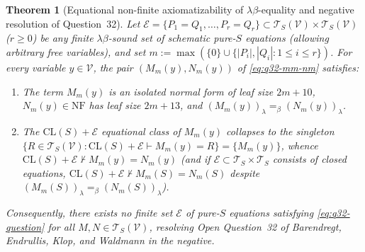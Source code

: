 \documentclass[11pt,reqno]{amsart}
\numberwithin{equation}{section}
\theoremstyle{plain}
\newtheorem{theorem}{Theorem}[section]
\theoremstyle{definition}
\theoremstyle{remark}
\newcommand{\CLS}{\mathrm{CL}(S)}
\newcommand{\TS}{\mathcal{T}_S}
\newcommand{\TSV}{\mathcal{T}_S(\mathcal{V})}
\newcommand{\NF}{\mathrm{NF}}
\begin{document}
\begin{theorem}[Equational non-finite axiomatizability of $\lambda\beta$-equality and negative resolution of Question~32]\label{thm:question-32}
Let $\mathcal{E} = \{P_1 = Q_1, \dots, P_r = Q_r\} \subset \TSV \times \TSV$ ($r \ge 0$) be any finite $\lambda\beta$-sound set of schematic pure-$S$ equations (allowing arbitrary free variables), and set $m := \max(\{0\} \cup \{|P_i|, |Q_i| : 1 \le i \le r\})$. For every variable $y \in \mathcal{V}$, the pair $(M_m(y), N_m(y))$ of \eqref{eq:q32-mm-nm} satisfies:
\begin{enumerate}[label=(\roman*),leftmargin=2.2em]
  \item The term $M_m(y)$ is an isolated normal form of leaf size $2m + 10$, $N_m(y) \in \NF$ has leaf size $2m + 13$, and $(M_m(y))_\lambda =_\beta (N_m(y))_\lambda$.
  \item The $\CLS + \mathcal{E}$ equational class of $M_m(y)$ collapses to the singleton $\{R \in \TSV : \CLS + \mathcal{E} \vdash M_m(y) = R\} = \{M_m(y)\}$, whence $\CLS + \mathcal{E} \nvdash M_m(y) = N_m(y)$ (and if $\mathcal{E} \subset \TS \times \TS$ consists of closed equations, $\CLS + \mathcal{E} \nvdash M_m(S) = N_m(S)$ despite $(M_m(S))_\lambda =_\beta (N_m(S))_\lambda$).
\end{enumerate}
Consequently, there exists no finite set $\mathcal{E}$ of pure-$S$ equations satisfying \eqref{eq:q32-question} for all $M, N \in \TSV$, resolving Open Question~32 of Barendregt, Endrullis, Klop, and Waldmann \cite[p.~94]{BarendregtEndrullisKlopWaldmann2017} in the negative.
\end{theorem}
\end{document}
